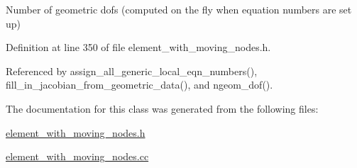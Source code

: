 Number of geometric dofs (computed on the fly when equation numbers are set up) 



Definition at line 350 of file element\+\_\+with\+\_\+moving\+\_\+nodes.\+h.



Referenced by assign\+\_\+all\+\_\+generic\+\_\+local\+\_\+eqn\+\_\+numbers(), fill\+\_\+in\+\_\+jacobian\+\_\+from\+\_\+geometric\+\_\+data(), and ngeom\+\_\+dof().



The documentation for this class was generated from the following files\+:\begin{DoxyCompactItemize}
\item 
\hyperlink{element__with__moving__nodes_8h}{element\+\_\+with\+\_\+moving\+\_\+nodes.\+h}\item 
\hyperlink{element__with__moving__nodes_8cc}{element\+\_\+with\+\_\+moving\+\_\+nodes.\+cc}\end{DoxyCompactItemize}
